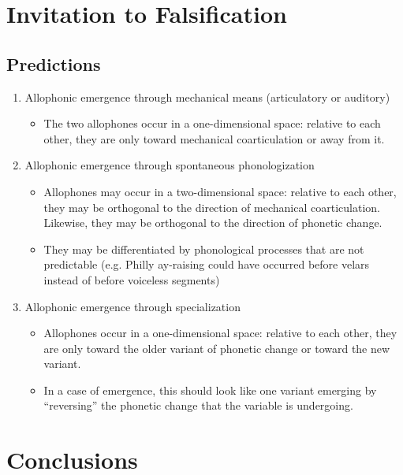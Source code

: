 \section{Invitation to Falsification}
\label{test}

\subsection{Predictions}
\begin{enumerate}
\item Allophonic emergence through mechanical means (articulatory or auditory)
	\begin{itemize}
		\item The two allophones occur in a one-dimensional space: relative to each other, they are only toward mechanical coarticulation or away from it.
	\end{itemize}
\item Allophonic emergence through spontaneous phonologization
	\begin{itemize}
		\item Allophones may occur in a two-dimensional space: relative to each other, they may be orthogonal to the direction of mechanical coarticulation. Likewise, they may be orthogonal to the direction of phonetic change.
		\item They may be differentiated by phonological processes that are not predictable (e.g. Philly ay-raising could have occurred before velars instead of before voiceless segments)
	\end{itemize}
\item Allophonic emergence through specialization
	\begin{itemize}
		\item Allophones occur in a one-dimensional space: relative to each other, they are only toward the older variant of phonetic change or toward the new variant.
		\item In a case of emergence, this should look like one variant emerging by ``reversing'' the phonetic change that the variable is undergoing.
	\end{itemize}
\end{enumerate}

\section{Conclusions}







